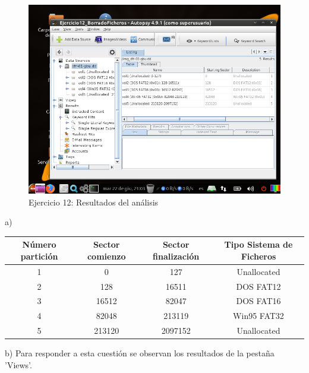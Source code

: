\documentclass[11pt]{article}
\begin{document}
\begin{figure}[H]
    \caption{Ejercicio 12: Resultados del análisis}
    \centering
    \includegraphics[scale=0.7]{e12-5.png}
\end{figure}

a)

\begin{table}[H]
    \centering
    \begin{tabular}{|c|c|c|c|}
        \hline
        Número partición & Sector comienzo & Sector finalización & Tipo Sistema de Ficheros \\
        \hline\hline
        1 & 0 & 127 & Unallocated \\
        \hline
        2 & 128 & 16511 & DOS FAT12 \\
        \hline
        3 & 16512 & 82047 & DOS FAT16 \\
        \hline
        4 & 82048 & 213119 & Win95 FAT32 \\
        \hline
        5 & 213120 & 2097152 & Unallocated \\
        \hline
    \end{tabular}
\end{table}

b) Para responder a esta cuestión se observan los resultados de la pestaña 'Views'.
\end{document}
